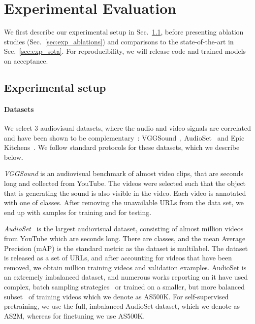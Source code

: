 \documentclass[10pt,twocolumn,letterpaper]{article}
\begin{document}
 \vspace{-1mm}
\section{Experimental Evaluation}
\vspace{-1mm}

We first describe our experimental setup in Sec.~\ref{sec:exp_setup}, before presenting ablation studies (Sec.~\ref{sec:exp_ablations}) and comparisons to the state-of-the-art in Sec.~\ref{sec:exp_sota}.
For reproducibility, we will release code and trained models on acceptance.

\vspace{-0.2\baselineskip}
\subsection{Experimental setup}
\label{sec:exp_setup}

\paragraph{Datasets}

We select 3 audiovisual datasets, where the audio and video signals are correlated 
and have been shown to be complementary~\cite{nagrani2021attention, jaegle2021perceiver, wang2020makes}:
VGGSound~\cite{chen2020alarge}, AudioSet~\cite{gemmeke2017audio} and Epic Kitchens~\cite{damen2022rescaling}.
We follow standard protocols for these datasets, which we describe below.



\noindent\quad\textit{VGGSound}\cite{chen2020alarge} is an audiovisual benchmark of almost  video clips, that are  seconds long and collected from YouTube.
The videos were selected such that the object that is generating the sound is also visible in the video.
Each video is annotated with one of  classes.
After removing the unavailable URLs from the data set, we end up with  samples for training and  for testing.

\noindent\quad\textit{AudioSet}~\cite{gemmeke2017audio} is the largest audiovisual dataset, consisting of almost  million videos from YouTube which are  seconds long.
There are  classes, and the mean Average Precision (mAP) is the standard metric as the dataset is multilabel.
The dataset is released as a set of URLs, and after accounting for videos that have been removed, we obtain  million training videos and  validation examples. AudioSet is an extremely imbalanced dataset, and numerous works reporting on it have used complex, batch sampling strategies~\cite{gong2021psla, gong2021ast, xu2022masked} or trained on a smaller, but more balanced subset~\cite{nagrani2021attention} of  training videos which we denote as AS500K.
For self-supervised pretraining, we use the full, imbalanced AudioSet dataset, which we denote as AS2M, whereas for finetuning we use AS500K.
\end{document}
